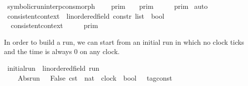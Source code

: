 \begin{isabellebody}
\isanewline
{}\isamarkupfalse%
\ symbolic{\isacharunderscore}run{\isacharunderscore}interp{\isacharunderscore}cons{\isacharunderscore}morph{\isacharcolon}\isanewline
\ \ {\isacartoucheopen}{\isasymlbrakk}\ {\isasymgamma}\ {\isasymrbrakk}\isactrlsub p\isactrlsub r\isactrlsub i\isactrlsub m\ {\isasyminter}\ {\isasymlbrakk}{\isasymlbrakk}\ {\isasymGamma}\ {\isasymrbrakk}{\isasymrbrakk}\isactrlsub p\isactrlsub r\isactrlsub i\isactrlsub m\ {\isacharequal}\ {\isasymlbrakk}{\isasymlbrakk}\ {\isasymgamma}\ {\isacharhash}\ {\isasymGamma}\ {\isasymrbrakk}{\isasymrbrakk}\isactrlsub p\isactrlsub r\isactrlsub i\isactrlsub m{\isacartoucheclose}\isanewline
%
\isadelimproof
%
\endisadelimproof
%
\isatagproof
{}\isamarkupfalse%
\ auto%
\endisatagproof
{\isafoldproof}%
%
\isadelimproof
\isanewline
%
\endisadelimproof
\isanewline
{}\isamarkupfalse%
\ consistent{\isacharunderscore}context\ {\isacharcolon}{\isacharcolon}\ {\isacartoucheopen}{\isacharparenleft}{\isacharprime}{\isasymtau}{\isacharcolon}{\isacharcolon}linordered{\isacharunderscore}field{\isacharparenright}\ constr\ list\ {\isasymRightarrow}\ bool{\isacartoucheclose}\isanewline
{}\ \isanewline
\ \ {\isacartoucheopen}consistent{\isacharunderscore}context\ {\isasymGamma}\ {\isasymequiv}\ {\isacharparenleft}\ {\isasymlbrakk}{\isasymlbrakk}\ {\isasymGamma}\ {\isasymrbrakk}{\isasymrbrakk}\isactrlsub p\isactrlsub r\isactrlsub i\isactrlsub m\ {\isasymnoteq}\ {\isacharbraceleft}{\isacharbraceright}{\isacharparenright}\ {\isacartoucheclose}%
\isadelimdocument
%
\endisadelimdocument
%
\isatagdocument
%
\isamarkuptrue%
%
\endisatagdocument
{\isafolddocument}%
%
\isadelimdocument
%
\endisadelimdocument
%
\begin{isamarkuptext}%
In order to build a run, we can start from an initial run in which no clock 
  ticks and the time is always 0 on any clock.%
\end{isamarkuptext}\isamarkuptrue%
\isamarkupfalse%
\ initial{\isacharunderscore}run\ {\isacharcolon}{\isacharcolon}\ {\isacartoucheopen}{\isacharparenleft}{\isacharprime}{\isasymtau}{\isacharcolon}{\isacharcolon}linordered{\isacharunderscore}field{\isacharparenright}\ run{\isacartoucheclose}\ {\isacharparenleft}{\isacartoucheopen}{\isasymrho}\isactrlsub {\isasymodot}{\isacartoucheclose}{\isacharparenright}\ \isanewline
\ \ {\isacartoucheopen}{\isasymrho}\isactrlsub {\isasymodot}\ {\isasymequiv}\ Abs{\isacharunderscore}run\ {\isacharparenleft}{\isacharparenleft}{\isasymlambda}{\isacharunderscore}\ {\isacharunderscore}{\isachardot}\ {\isacharparenleft}False{\isacharcomma}\ {\isasymtau}\isactrlsub c\isactrlsub s\isactrlsub t\ {}{\isacharparenright}{\isacharparenright}\ {\isacharcolon}{\isacharcolon}nat\ {\isasymRightarrow}\ clock\ {\isasymRightarrow}\ {\isacharparenleft}bool\ {\isasymtimes}\ {\isacharprime}{\isasymtau}\ tag{\isacharunderscore}const{\isacharparenright}{\isacharparenright}{\isacartoucheclose}%

\end{isabellebody}
